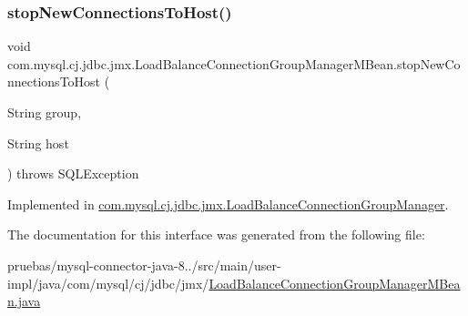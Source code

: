 \mbox{\label{interfacecom_1_1mysql_1_1cj_1_1jdbc_1_1jmx_1_1_load_balance_connection_group_manager_m_bean_a8f15db86412fbd3a8e43da0e1bc78fd6}} 
\subsubsection{\texorpdfstring{stop\+New\+Connections\+To\+Host()}{stopNewConnectionsToHost()}}
{\footnotesize\ttfamily void com.\+mysql.\+cj.\+jdbc.\+jmx.\+Load\+Balance\+Connection\+Group\+Manager\+M\+Bean.\+stop\+New\+Connections\+To\+Host (\begin{DoxyParamCaption}\item[{String}]{group,  }\item[{String}]{host }\end{DoxyParamCaption}) throws S\+Q\+L\+Exception}



Implemented in \mbox{\hyperlink{classcom_1_1mysql_1_1cj_1_1jdbc_1_1jmx_1_1_load_balance_connection_group_manager_aded5d0e2efbd9f4a39e3347da772412a}{com.\+mysql.\+cj.\+jdbc.\+jmx.\+Load\+Balance\+Connection\+Group\+Manager}}.



The documentation for this interface was generated from the following file\+:\begin{DoxyCompactItemize}
\item 
pruebas/mysql-\/connector-\/java-\/8../src/main/user-\/impl/java/com/mysql/cj/jdbc/jmx/\mbox{\hyperlink{_load_balance_connection_group_manager_m_bean_8java}{Load\+Balance\+Connection\+Group\+Manager\+M\+Bean.\+java}}\end{DoxyCompactItemize}
